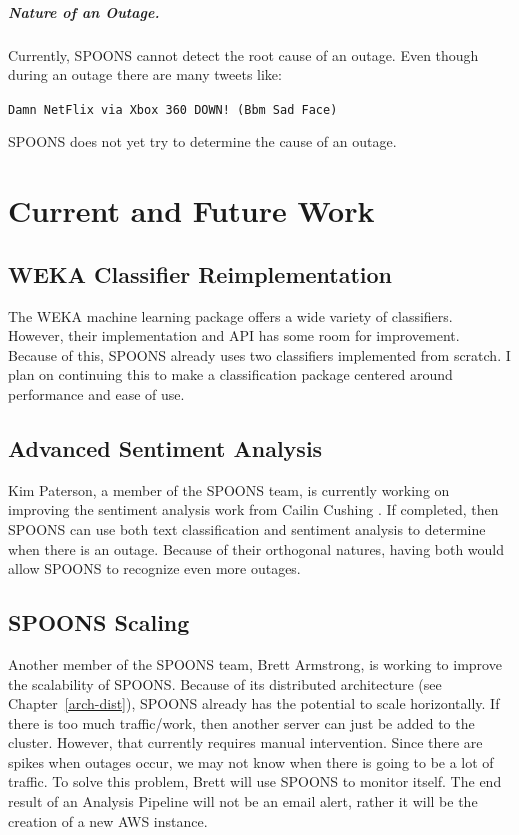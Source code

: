 \documentclass[12pt]{ucthesis}
\begin{document}
\paragraph{Nature of an Outage.}
Currently, SPOONS cannot detect the root cause of an outage.
Even though during an outage there are many tweets like:
\begin{center}
   \texttt{Damn NetFlix via Xbox 360 DOWN! (Bbm Sad Face)}
\end{center}
SPOONS does not yet try to determine the cause of an outage.

\chapter{Current and Future Work}
\label{future-work}

\section{WEKA Classifier Reimplementation}
\label{future-work-weka}
The WEKA machine learning package offers a wide variety of classifiers.
However, their implementation and API has some room for improvement.
Because of this, SPOONS already uses two classifiers implemented from scratch.
I plan on continuing this to make a classification package centered around performance
and ease of use.

\section{Advanced Sentiment Analysis}
\label{future-work-kim}
Kim Paterson, a member of the SPOONS team, is currently working on improving the sentiment
analysis work from Cailin Cushing \cite{cailinThesis}. If completed, then SPOONS can use
both text classification and sentiment analysis to determine when there is an outage.
Because of their orthogonal natures, having both would allow SPOONS to recognize even more outages.

\section{SPOONS Scaling}
\label{future-work-brett}
Another member of the SPOONS team, Brett Armstrong, is working to improve the scalability of SPOONS.
Because of its distributed architecture (see Chapter~\ref{arch-dist}), SPOONS already has the potential to
scale horizontally. If there is too much traffic/work, then another server can just be added to the cluster.
However, that currently requires manual intervention. Since there are spikes when outages occur, we may not know
when there is going to be a lot of traffic. To solve this problem, Brett will use SPOONS to monitor itself.
The end result of an Analysis Pipeline will not be an email alert, rather it will be the creation of a new
AWS instance.
\end{document}
